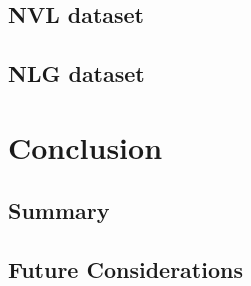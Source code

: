\documentclass{ieeeojies}
\begin{document}
\subsection{NVL dataset} 

\subsection{NLG dataset} 

\section{Conclusion}
\subsection{Summary}

\subsection{Future Considerations}
\end{document}
